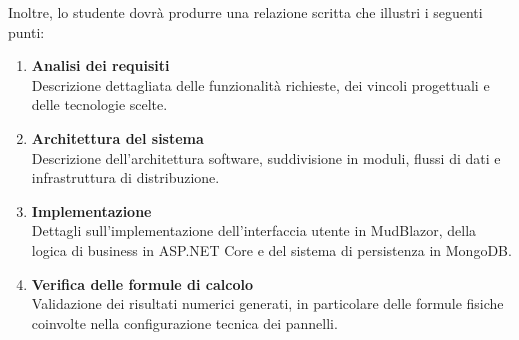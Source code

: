 \bigskip

Inoltre, lo studente dovrà produrre una relazione scritta che illustri i seguenti punti:

\begin{enumerate}
    \item \textbf{Analisi dei requisiti} \\
    Descrizione dettagliata delle funzionalità richieste, dei vincoli progettuali e delle tecnologie scelte.

    \item \textbf{Architettura del sistema} \\
    Descrizione dell’architettura software, suddivisione in moduli, flussi di dati e infrastruttura di distribuzione.

    \item \textbf{Implementazione} \\
    Dettagli sull’implementazione dell’interfaccia utente in MudBlazor, della logica di business in ASP.NET Core e del sistema di persistenza in MongoDB.

    \item \textbf{Verifica delle formule di calcolo} \\
    Validazione dei risultati numerici generati, in particolare delle formule fisiche coinvolte nella configurazione tecnica dei pannelli.
\end{enumerate}
